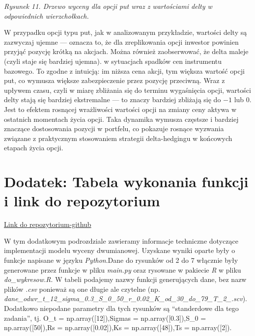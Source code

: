 \documentclass[
]{article}
\begin{document}
\emph{Rysunek 11. Drzewo wyceny dla opcji put wraz z wartościami delty w
odpowiednich wierzchołkach.}

W przypadku opcji typu put, jak w analizowanym przykładzie, wartości
delty są zazwyczaj ujemne --- oznacza to, że dla zreplikowania opcji
inwestor powinien przyjąć pozycję krótką na akcjach. Można również
zaobserwować, że delta maleje (czyli staje się bardziej ujemna). w
sytuacjach spadków cen instrumentu bazowego. To zgodne z intuicją: im
niższa cena akcji, tym większa wartość opcji put, co wymusza większe
zabezpieczenie przez pozycję przeciwną. Wraz z upływem czasu, czyli w
miarę zbliżania się do terminu wygaśnięcia opcji, wartości delty stają
się bardziej ekstremalne --- to znaczy bardziej zbliżają się do \(-1\)
lub \(0\). Jest to efektem rosnącej wrażliwości wartości opcji na zmiany
ceny aktywa w ostatnich momentach życia opcji. Taka dynamika wymusza
częstsze i bardziej znaczące dostosowania pozycji w portfelu, co
pokazuje rosnące wyzwania związane z praktycznym stosowaniem strategii
delta-hedgingu w końcowych etapach życia opcji.

\newpage

\hypertarget{dodatek-tabela-wykonania-funkcji-i-link-do-repozytorium}{%
\section{Dodatek: Tabela wykonania funkcji i link do
repozytorium}\label{dodatek-tabela-wykonania-funkcji-i-link-do-repozytorium}}

\href{https://github.com/Jankozlowski1234/wdif_projekt}{Link do
repozytorium-github}

W tym dodatkowym podrozdziale zawieramy informacje techniczne dotyczące
implementacji modelu wyceny dwumianowej. Uzyskane wyniki oparte były o
funkcje napisane w języku \emph{Python}.Dane do rysunków od 2 do 7
włącznie były generowane przez funkcje w pliku \emph{main.py} oraz
rysowane w pakiecie \emph{R} w pliku \emph{do\_wykresow.R}. W tabeli
podajemy nazwy funkcji generujących dane, bez nazw plików \emph{.csv}
ponieważ są one długie ale czytelne (np.
\emph{dane\_odwr\_t\_12\_sigma\_0.3\_S\_0\_50\_r\_0.02\_K\_od\_30\_do\_79\_T\_2\_.scv}).
Dodatkowo niepodane parametry dla tych rysunków są ``standerdowe dla
tego zadania'', tj. O\_t = np.array({[}12{]}),Sigmas =
np.array({[}0.3{]}),S\_0 = np.array({[}50{]}),Rs =
np.array({[}0.02{]}),Ks = np.array({[}48{]}),Ts = np.array({[}2{]}).

\begingroup\fontsize{7}{9}\selectfont
\end{document}
